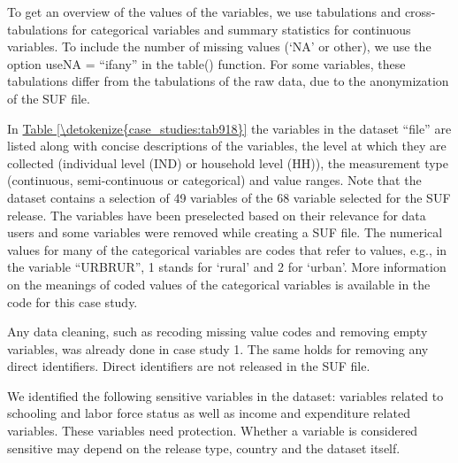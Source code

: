 \documentclass[letterpaper,10pt,english]{sphinxmanual}
\begin{document}
To get an overview of the values of the variables, we use tabulations
and cross-tabulations for categorical variables and summary statistics
for continuous variables. To include the number of missing values (‘NA’
or other), we use the option useNA = “ifany” in the table() function.
For some variables, these tabulations differ from the tabulations of the
raw data, due to the anonymization of the SUF file.

In \hyperref[\detokenize{case_studies:tab918}]{Table \ref{\detokenize{case_studies:tab918}}} the variables in the dataset “file” are listed along with
concise descriptions of the variables, the level at which they are
collected (individual level (IND) or household level (HH)), the
measurement type (continuous, semi-continuous or categorical) and value
ranges. Note that the dataset contains a selection of 49 variables of
the 68 variable selected for the SUF release. The variables have been
preselected based on their relevance for data users and some variables
were removed while creating a SUF file. The numerical values for many of
the categorical variables are codes that refer to values, e.g., in the
variable “URBRUR”, 1 stands for ‘rural’ and 2 for ‘urban’. More
information on the meanings of coded values of the categorical variables
is available in the  code for this case study.

Any data cleaning, such as recoding missing value codes and removing
empty variables, was already done in case study 1. The same holds for
removing any direct identifiers. Direct identifiers are not released in
the SUF file.

We identified the following sensitive variables in the dataset:
variables related to schooling and labor force status as well as income
and expenditure related variables. These variables need protection.
Whether a variable is considered sensitive may depend on the release
type, country and the dataset itself.
\end{document}
